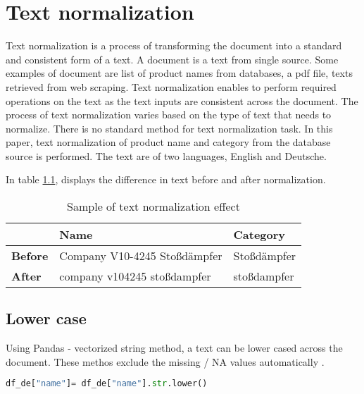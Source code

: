 \chapter{Text normalization} \label{text_normalization}

Text normalization is a process of transforming the document into a standard and consistent form of a text. A document is a text from single source. Some examples of document are list of product names from databases, a pdf file, texts retrieved from web scraping. Text normalization enables to perform required operations on the text as the text inputs are consistent across the document. The process of text normalization varies based on the type of text that needs to normalize. There is no standard method for text normalization task. In this paper, text normalization of product name and category from the database source is performed. The text are of two languages, English and Deutsche.

In table \ref{table:TN}, displays the difference in text before and after normalization. 

\begin{table}[h]
      \caption{Sample of text normalization effect}
      \centering
      \label{table:TN}
\begin{tabular}{lll}
      \toprule 
                  &\textbf{Name} & \textbf{Category} \\ 
      \midrule
      \textbf{Before}& Company V10-4245 Stoßdämpfer & Stoßdämpfer \\
      \textbf{After}&company v104245 stoßdampfer & stoßdampfer \\
      
      \bottomrule
\end{tabular}
\end{table}

\section{Lower case}

Using Pandas - vectorized string method, a text can be lower cased across the document. These methos exclude the missing  / NA values automatically \parencite{mckinney-proc-scipy-2010}.

\begin{lstlisting}[language=Python, caption={Pandas vectorized string method }]
      df_de["name"]= df_de["name"].str.lower()
\end{lstlisting}

